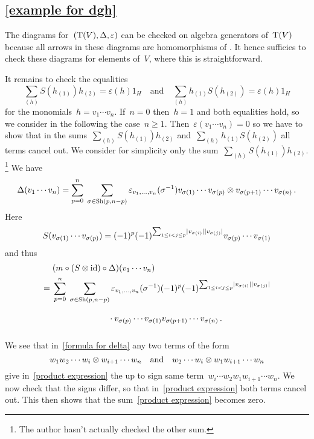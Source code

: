 \subsection{\cref{example for dgh}}
\label{example for dgh proof}

The {\dgc} diagrams for~$(\operatorname{T}(V), \Delta, \varepsilon)$ can be checked on algebra generators of~$\operatorname{T}(V)$ because all arrows in these diagrams are homomorphisms of {\dgas}.
It hence sufficies to check these diagrams for elements of~$V$, where this is straightforward.

It remains to check the equalities
\[
  \sum_{(h)} S(h_{(1)}) h_{(2)}
  =
  \varepsilon(h) 1_H
  \quad
  \text{and}\quad
  \sum_{(h)} h_{(1)} S(h_{(2)})
  =
  \varepsilon(h) 1_H
\]
for the monomials~$h = v_1 \dotsm v_n$.
If~$n = 0$ then~$h = 1$ and both equalities hold, so we consider in the following the case~$n \geq 1$.
Then~$\varepsilon(v_1 \dotsm v_n) = 0$ so we have to show that in the sums~$\sum_{(h)} S(h_{(1)}) h_{(2)}$ and~$\sum_{(h)} h_{(1)} S(h_{(2)})$ all terms cancel out.
We consider for simplicity only the sum~$\sum_{(h)} S(h_{(1)}) h_{(2)}$.%
\footnote{The author hasn’t actually checked the other sum.}
We have
\begin{equation}
  \label{formula for delta}
  \Delta(v_1 \dotsm v_n)
  =
  \sum_{p=0}^n
  \;
  \sum_{\sigma \in \operatorname{Sh}(p,n-p)}
  \varepsilon_{v_1, \dotsc, v_n}(\sigma^{-1})
  v_{\sigma(1)} \dotsm v_{\sigma(p)} \otimes v_{\sigma(p+1)} \dotsm v_{\sigma(n)} \,.
\end{equation}
Here
\[
  S(v_{\sigma(1)} \dotsm v_{\sigma(p)})
  =
  (-1)^p
  (-1)^{\sum_{1 \leq i < j \leq p} \lvert v_{\sigma(i)}\rvert \lvert v_{\sigma(j)}\rvert}
  v_{\sigma(p)} \dotsm v_{\sigma(1)}
\]
and thus
\begin{align}
  {}&
  (m \circ (S \tensor {\id}) \circ \Delta)(v_1 \dotsm v_n)
  \notag
\\
  ={}&
  \sum_{p=0}^n
  \;
  \sum_{\sigma \in \Sh(p,n-p)}
  \varepsilon_{v_1, \dotsc, v_n}(\sigma^{-1})
  (-1)^p
  (-1)^{\sum_{1 \leq i < j \leq p} \hdeg{v_{\sigma(i)}} \hdeg{v_{\sigma(j)}}}
  \notag
\\
  {}&
  \phantom{\sum_{p=0}^n \; \sum_{\sigma \in \Sh(p,n-p)}}
  \cdot v_{\sigma(p)} \dotsm v_{\sigma(1)} v_{\sigma(p+1)} \dotsm v_{\sigma(n)} \,.
  \label{product expression}
\end{align}
We see that in~\eqref{formula for delta} any two terms of the form
\[
  w_1 w_2 \dotsm w_i \otimes w_{i+1} \dotsm w_n
  \quad\text{and}\quad
  w_2 \dotsm w_i \otimes w_1 w_{i+1} \dotsm w_n
\]
give in~\eqref{product expression} the up to sign same term~$w_i \dotsm w_2 w_1 w_{i+1} \dotsm w_n$.
We now check that the signs differ, so that in~\eqref{product expression} both terms cancel out.
This then shows that the sum~\eqref{product expression} becomes zero.

